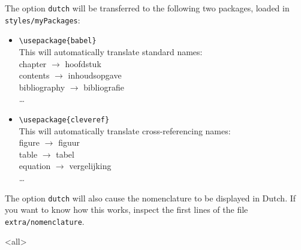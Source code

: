 The option \texttt{dutch} will be transferred to the following two packages, loaded in \texttt{styles/myPackages}:
    \begin{itemize}
        \item \verb|\usepackage{babel}|\\
        This will automatically translate standard names:\\
        chapter $\to$ hoofdstuk\\
        contents $\to$ inhoudsopgave\\
        bibliography $\to$ bibliografie\\\dots
        \item \verb|\usepackage{cleveref}|\\
        This will automatically translate cross-referencing names:
        \\figure $\to$ figuur\\
        table $\to$ tabel\\
        equation $\to$ vergelijking\\\dots
    \end{itemize}

The option \texttt{dutch} will also cause the nomenclature to be displayed in Dutch. If you want to know how this works, inspect the first lines of the file \texttt{extra/nomenclature}.

\mode<all>
